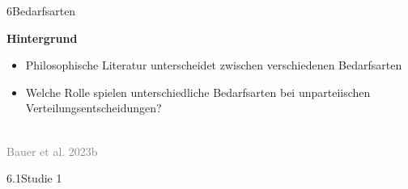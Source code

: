 \documentclass[xcolor=table,9pt,aspectratio=169]{beamer}
\begin{document}
\begin{frame}{\vspace*{10mm}6\hspace*{1em}Bedarfsarten}
\begin{multicols}{2}
   \textbf{Hintergrund}\\
   \medskip
   \begin{itemize}
      \item Philosophische Literatur unterscheidet zwischen verschiedenen Bedarfsarten
      \item Welche Rolle spielen unterschiedliche Bedarfsarten bei unparteiischen Verteilungsentscheidungen?
   \end{itemize}
   \vfill
   \begin{center}
      \\
      \textcolor{gray}{Bauer et al. 2023b}
   \end{center}
\end{multicols}
\end{frame}


\begin{frame}
\begin{overlayarea}{\textwidth}{0.81\paperheight}{
   \vspace*{11mm}
   \textcolor{uolblue}
   {6.1\hspace*{1em}Studie 1}
}
\end{overlayarea}
\end{frame}
\end{document}
